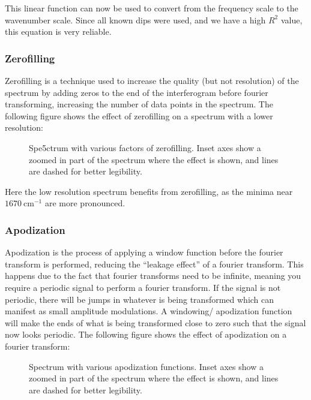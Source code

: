 \documentclass{article}
\begin{document}
This linear function can now be used to convert from the frequency scale to the wavenumber scale. Since all known dips were used, and we have a high $R^2$ value, this equation is very reliable.  

\pagebreak{}

\subsubsection{Zerofilling}

Zerofilling is a technique used to increase the quality (but not resolution) of the spectrum by adding zeros to the end of the interferogram before fourier transforming, increasing the number of data points in the spectrum. The following figure shows the effect of zerofilling on a spectrum with a lower resolution:

 \begin{figure}[h!]
	\centering
	\scalebox{0.7}{}
	\caption{Spe5ctrum with various factors of zerofilling. Inset axes show a zoomed in part of the spectrum where the effect is shown, and lines are dashed for better legibility.}
	\label{fig:zerofilling}
\end{figure}

Here the low resolution spectrum benefits from zerofilling, as the minima near $1670 \ \text{cm}^{-1}$ are more pronounced.

\pagebreak{}

\subsubsection{Apodization}

Apodization is the process of applying a window function before the fourier transform is performed, reducing the ``leakage effect'' of a fourier transform. This happens due to the fact that fourier transforms need to be infinite, meaning you require a periodic signal to perform a fourier transform. If the signal is not periodic, there will be jumps in whatever is being transformed which can manifest as small amplitude modulations. A windowing/ apodization function will make the ends of what is being transformed close to zero such that the signal now looks periodic. The following figure shows the effect of apodization on a fourier transform:

\begin{figure}[h!]
	\centering
	\scalebox{0.75}{}
	\caption{Spectrum with various apodization functions. Inset axes show a zoomed in part of the spectrum where the effect is shown, and lines are dashed for better legibility.}
	\label{fig:apodization}
\end{figure}
\end{document}
